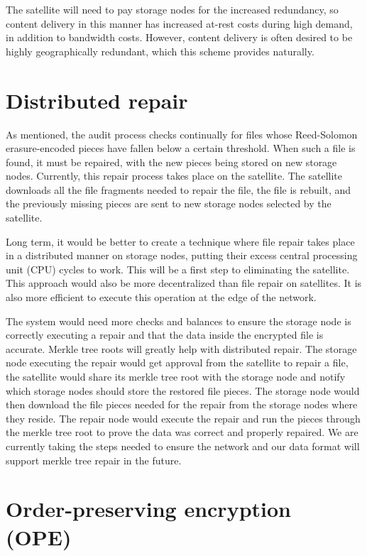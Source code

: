 \documentclass[11pt,fleqn,openany]{book}
\begin{document}
The satellite will need to pay storage nodes for the increased redundancy, so
content delivery in this manner has increased at-rest costs during high
demand, in addition to bandwidth costs. However, content delivery is often
desired to be highly geographically redundant, which this scheme provides
naturally.

\section{Distributed repair}\label{sec:future-distributed-repair}

As mentioned, the audit process checks continually for files whose Reed-Solomon
erasure-encoded pieces have fallen below a certain threshold. When such a file
is found, it must be repaired, with
the new pieces being stored on new storage nodes.
Currently, this
repair process takes place on the satellite. The satellite downloads all
the file fragments needed to repair the file, the file is rebuilt, and the
previously missing pieces are sent to new storage nodes
selected by the satellite.

Long term, it would be better to create a technique where file repair takes
place in a distributed manner on storage nodes, putting their excess central processing
unit (CPU) cycles to work. This will be a first step to eliminating the satellite. This
approach would also be more decentralized than file repair on satellites. It
is also more efficient to execute this operation at the edge of the network.

The system would need more checks and balances to ensure the storage node is
correctly
executing a repair and that the data inside the encrypted file is accurate.
Merkle tree roots will greatly help with distributed repair. The storage
node
executing the repair would get approval from the satellite to repair a file,
the satellite would share its merkle tree root with the storage node and
notify
which storage nodes should store the restored file pieces. The storage node
would then
download the file pieces needed for the repair from the storage nodes where they
reside. The repair node would execute the repair and run the pieces
through the merkle tree root to prove the data was correct and properly
repaired. We are currently taking the steps needed to ensure the network and our
data format will support merkle tree repair in the future.

\section{Order-preserving encryption (OPE)}\label{section:OPE}
\end{document}
